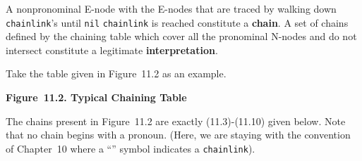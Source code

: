 \documentclass{article}
\begin{document}
A nonpronominal E-node with the E-nodes that are traced by
walking down \texttt{chainlink}'s until \texttt{nil}
\texttt{chainlink} is reached constitute a
 \textbf{chain}. A set of chains defined by the
chaining table which cover all the pronominal N-nodes and do not
intersect constitute a legitimate 
\textbf{interpretation}.

Take the table given in Figure~11.2 as an example.


\bigbreak
\begin{minipage}{\textwidth}
\bigbreak
\textbf{Figure~11.2. Typical Chaining Table}
\end{minipage}
\bigbreak

The chains present in Figure~11.2 are exactly (11.3)-(11.10)
given below. Note that no chain begins with a pronoun. (Here, we
are staying with the convention of Chapter~10 where a
``\texttt{}'' symbol indicates a \texttt{chainlink}).
\end{document}
